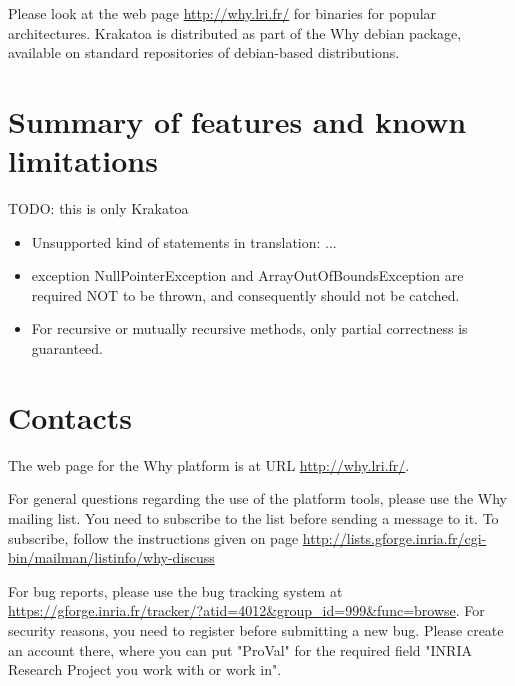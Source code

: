 \documentclass[a4paper,11pt,twoside,openright]{report}
\begin{document}
Please look at the web page \url{http://why.lri.fr/} for binaries for
popular architectures. Krakatoa is distributed as part of the Why
debian package, available on standard repositories of debian-based
distributions.
 
\section{Summary of features and known limitations}
\label{sec:features}

TODO: this is only Krakatoa

\begin{itemize}

\item Unsupported kind of statements in translation: ...

\item exception NullPointerException and ArrayOutOfBoundsException are
required NOT to be thrown, and consequently should not be catched.


\item For recursive or mutually recursive methods, only partial
correctness is guaranteed.

\end{itemize}

\section{Contacts}

The web page for the Why platform is at URL \url{http://why.lri.fr/}.

For general questions regarding the use of the platform tools, please
use the Why mailing list. You need to subscribe to the list before
sending a message to it. To subscribe, follow the instructions given
on page
\url{http://lists.gforge.inria.fr/cgi-bin/mailman/listinfo/why-discuss}

For bug reports, please use the bug tracking system at
\url{https://gforge.inria.fr/tracker/?atid=4012&group_id=999&func=browse}. For
security reasons, you need to register before submitting a new
bug. Please create an account there, where you can put "ProVal" for
the required field "INRIA Research Project you work with or work in".
\end{document}
